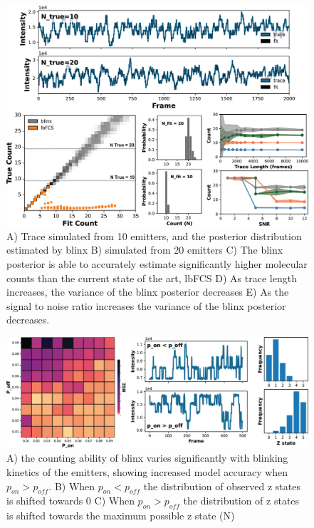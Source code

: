 \documentclass[twocolumn]{article}
\begin{document}
\begin{figure}
  \includegraphics[width=\linewidth]{figures/placeholders/figure_2_simulated_counting.png}
  \caption{A) Trace simulated from 10 emitters, and the posterior distribution estimated by blinx B) simulated from 20 emitters
  C) The blinx posterior is able to accurately estimate significantly higher molecular counts than the current state of the art, lbFCS
  D) As trace length increases, the variance of the blinx posterior decreases E) As the signal to noise ratio increases the variance of 
  the blinx posterior decreases. }
  \label{fig:method:overview}
\end{figure}

\begin{figure}
  \includegraphics[width=\linewidth]{figures/placeholders/figure_3_compare_kinetics.png}
  \caption{A) the counting ability of blinx varies significantly with blinking kinetics of the emitters, showing increased model accuracy when
   $p_{on} > p_{off}$. B) When $p_{on} < p_{off}$ the distribution of observed z states is shifted towards 0 C) When $p_{on} > p_{off}$ the 
   distribution of z states is shifted towards the maximum possible z state (N)}
  \label{fig:method:overview}
\end{figure}
\end{document}
